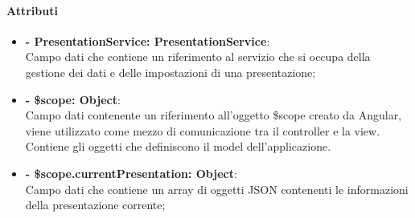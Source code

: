 	\paragraph{Attributi}
	\begin{itemize}
		\item \textbf{- PresentationService: PresentationService}:\\
			Campo dati che contiene un riferimento al servizio che si occupa della gestione dei dati e delle impostazioni di una presentazione;
		\item \textbf{- \$scope: Object}:\\
			Campo dati contenente un riferimento all'oggetto \$scope creato da Angular, viene utilizzato come mezzo di comunicazione tra il controller e la view. Contiene gli oggetti che definiscono il model dell'applicazione.
		\item \textbf{- \$scope.currentPresentation: Object}:\\
			Campo dati che contiene un array di oggetti JSON contenenti le informazioni della presentazione corrente;

	\end{itemize}

